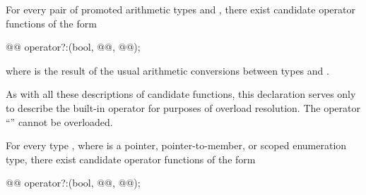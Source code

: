 \pnum
For every pair of promoted arithmetic types
and
,
there exist candidate operator functions of the form

\begin{codeblock}
@@      operator?:(bool, @@, @@);
\end{codeblock}

where
is the result of the usual arithmetic conversions between types
and
.
\begin{note}
As with all these descriptions of candidate functions, this declaration serves
only to describe the built-in operator for purposes of overload resolution.
The operator
``''
cannot be overloaded.
\end{note}

\pnum
For every type
,
where
is a pointer, pointer-to-member, or scoped enumeration type, there exist candidate operator
functions of the form

\begin{codeblock}
@@       operator?:(bool, @@, @@);
\end{codeblock}%
